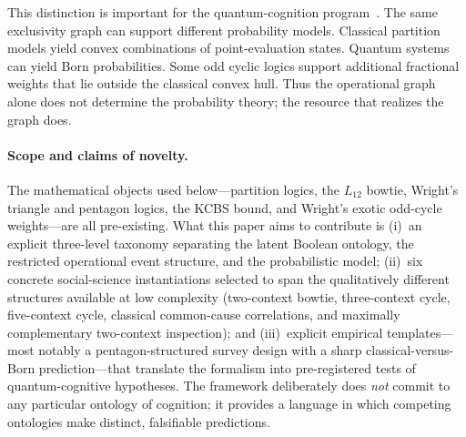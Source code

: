 \documentclass{article}
\begin{document}
This distinction is important for the quantum-cognition
program~\cite{Busemeyer2012,Pothos2013}. The same exclusivity graph
can support different probability models. Classical partition
models yield convex combinations of point-evaluation states. Quantum
systems can yield Born probabilities. Some odd cyclic logics support
additional fractional weights that lie outside the classical convex
hull. Thus the operational graph alone does not determine the
probability theory; the resource that realizes the graph does.

\paragraph{Scope and claims of novelty.}
The mathematical objects used below---partition logics, the $L_{12}$
bowtie, Wright's triangle and pentagon logics, the KCBS bound, and
Wright's exotic odd-cycle weights---are all pre-existing. What this
paper aims to contribute is (i)~an explicit three-level taxonomy
separating the latent Boolean ontology, the restricted operational
event structure, and the probabilistic model; (ii)~six concrete
social-science instantiations selected to span the qualitatively
different structures available at low complexity (two-context
bowtie, three-context cycle, five-context cycle, classical
common-cause correlations, and maximally complementary two-context
inspection); and (iii)~explicit empirical templates---most notably a
pentagon-structured survey design with a sharp classical-versus-Born
prediction---that translate the formalism into pre-registered tests
of quantum-cognitive hypotheses. The framework deliberately does
\emph{not} commit to any particular ontology of cognition; it
provides a language in which competing ontologies make distinct,
falsifiable predictions.
\end{document}
